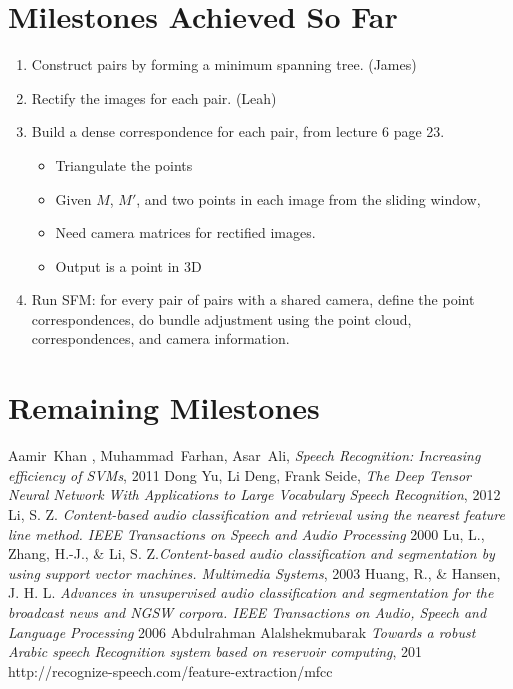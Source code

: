 \documentclass[journal]{IEEEtran}
\begin{document}
\section{Milestones Achieved So Far} \label{achieved}
\begin{enumerate}
  \item Construct pairs by forming a minimum spanning tree. (James)
  \item Rectify the images for each pair. (Leah)
  \item Build a dense correspondence for each pair, from lecture 6 page 23.
  \begin{itemize}
    \item Triangulate the points
    \item Given $M$, $M'$, and two points in each image from the sliding window,
    \item Need camera matrices for rectified images.
    \item Output is a point in 3D
  \end{itemize}
  \item Run SFM: for every pair of pairs with a shared camera, define the point correspondences, do bundle adjustment using the point cloud, correspondences, and camera information.
\end{enumerate}


\section{Remaining Milestones} \label{remaining}

\ifCLASSOPTIONcaptionsoff
  \newpage
\fi
\begin{thebibliography}{1}

Aamir~Khan , Muhammad~Farhan, Asar~Ali, \emph{Speech Recognition: Increasing efficiency of SVMs}, 2011
\bibitem{}
Dong Yu, Li Deng, Frank Seide, \emph{The Deep Tensor Neural Network With Applications to Large Vocabulary Speech Recognition}, 2012
\bibitem{}
Li, S. Z. \emph{Content-based audio classification and retrieval using the nearest feature line method. IEEE Transactions on Speech and Audio Processing} 2000
\bibitem{}
Lu, L., Zhang, H.-J., \& Li, S. Z.\emph{Content-based audio classification and segmentation by using support vector machines. Multimedia Systems}, 2003
\bibitem{}
Huang, R., \& Hansen, J. H. L. \emph{Advances in unsupervised audio classification and segmentation for the broadcast news and NGSW corpora. IEEE Transactions on Audio, Speech and Language Processing} 2006
\bibitem{}
Abdulrahman Alalshekmubarak \emph{Towards a robust Arabic speech Recognition system based on reservoir computing}, 201
\bibitem{}
http://recognize-speech.com/feature-extraction/mfcc
\end{thebibliography}
\end{document}
